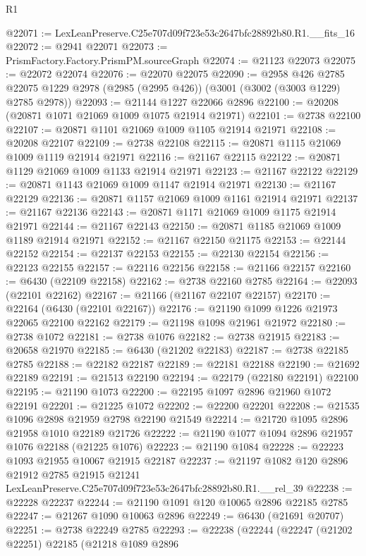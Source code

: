 \begin{lexlean}{R1}
\begin{coremodule}
@22071 := LexLeanPreserve.C25e707d09f723e53c2647bfc28892b80.R1.__fits_16
@22072 := @2941 @22071
@22073 := PrismFactory.Factory.PrismPM.sourceGraph
@22074 := @21123 @22073
@22075 := @22072 @22074
@22076 := @22070 @22075
@22090 := @2958
    @426
    @2785
    @22075
    @1229
    @2978
    (@2985 (@2995 @426))
    (@3001 (@3002 (@3003 @1229) @2785 @2978))
@22093 := @21144 @1227 @22066 @2896
@22100 := @20208 (@20871 @1071 @21069 @1009 @1075 @21914 @21971)
@22101 := @2738 @22100
@22107 := @20871 @1101 @21069 @1009 @1105 @21914 @21971
@22108 := @20208 @22107
@22109 := @2738 @22108
@22115 := @20871 @1115 @21069 @1009 @1119 @21914 @21971
@22116 := @21167 @22115
@22122 := @20871 @1129 @21069 @1009 @1133 @21914 @21971
@22123 := @21167 @22122
@22129 := @20871 @1143 @21069 @1009 @1147 @21914 @21971
@22130 := @21167 @22129
@22136 := @20871 @1157 @21069 @1009 @1161 @21914 @21971
@22137 := @21167 @22136
@22143 := @20871 @1171 @21069 @1009 @1175 @21914 @21971
@22144 := @21167 @22143
@22150 := @20871 @1185 @21069 @1009 @1189 @21914 @21971
@22152 := @21167 @22150 @21175
@22153 := @22144 @22152
@22154 := @22137 @22153
@22155 := @22130 @22154
@22156 := @22123 @22155
@22157 := @22116 @22156
@22158 := @21166 @22157
@22160 := @6430 (@22109 @22158)
@22162 := @2738 @22160 @2785
@22164 := @22093 (@22101 @22162)
@22167 := @21166 (@21167 @22107 @22157)
@22170 := @22164 (@6430 (@22101 @22167))
@22176 := @21190 @1099 @1226 @21973 @22065 @22100 @22162
@22179 := @21198 @1098 @21961 @21972
@22180 := @2738 @1072
@22181 := @2738 @1076
@22182 := @2738 @21915
@22183 := @20658 @21970
@22185 := @6430 (@21202 @22183)
@22187 := @2738 @22185 @2785
@22188 := @22182 @22187
@22189 := @22181 @22188
@22190 := @21692 @22189
@22191 := @21513 @22190
@22194 := @22179 (@22180 @22191) @22100
@22195 := @21190 @1073
@22200 := @22195 @1097 @2896 @21960 @1072 @22191
@22201 := @21225 @1072
@22202 := @22200 @22201
@22208 := @21535 @1096 @2898 @21959 @2798 @22190 @21549
@22214 := @21720 @1095 @2896 @21958 @1010 @22189 @21726
@22222 := @21190 @1077 @1094 @2896 @21957 @1076 @22188 (@21225 @1076)
@22223 := @21190 @1084
@22228 := @22223 @1093 @21955 @10067 @21915 @22187
@22237 := @21197
    @1082
    @120
    @2896
    @21912
    @2785
    @21915
    @21241
    LexLeanPreserve.C25e707d09f723e53c2647bfc28892b80.R1.__rel_39
@22238 := @22228 @22237
@22244 := @21190 @1091 @120 @10065 @2896 @22185 @2785
@22247 := @21267 @1090 @10063 @2896
@22249 := @6430 (@21691 @20707)
@22251 := @2738 @22249 @2785
@22293 := @22238
    (@22244
      (@22247
        (@21202 @22251)
        @22185
        (@21218
          @1089
          @2896

\end{coremodule}
\end{lexlean}
